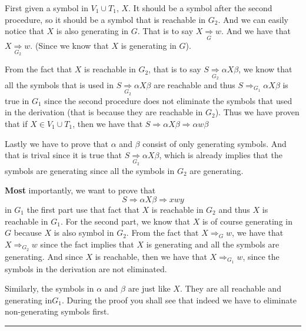 \documentclass[../main.tex]{subfiles}
\begin{document}
\begin{itemize}
First given a symbol in \(V _{1} \cup T _{1}\), \(X\). It 
should be a symbol after the second procedure, so it should 
be a symbol that is reachable in \(G _{2}\). And we can 
easily notice that \(X\) is also generating in \(G\). 
		That is to say \(X \mathop{\Rightarrow}\limits_{G} w\). And we have that \(X \mathop{\Rightarrow} \limits_{G_{2}} w\). (Since we know that \(X\) is generating in \(G\)).

		From the fact that \(X\) is reachable in \(G_{2}\), that is to say \(S \mathop{\Rightarrow} \limits_{G_{2}}\alpha X\beta \), we know that all the symbols that is used in 
		\(S \mathop{\Rightarrow}\limits _{G_{2}}\alpha X\beta\) are reachable and thus \(S \Rightarrow _{G_{1}}\alpha X\beta  \) is true in \(G _{1}\)  since the second procedure 
		does not eliminate the symbols that used in the 
		derivation (that is because they are reachable in \(G_{2}\)). Thus we have proven that if \(X \in V_{1} \cup T_{1}\), then we have that \(S \Rightarrow\alpha X\beta \Rightarrow\alpha w\beta\)

		Lastly we have to prove that \(\alpha\) and \(\beta\) consist of only generating symbols. And that is trival since it is true that \(S \mathop{\Rightarrow} \limits_{G_{2}} \alpha X\beta\), which is already implies that the symbols are 
		generating since all the symbols in \(G_{2}\) are 
		generating. 

		\textbf{Most} importantly, 
		we want to prove that 
		\[
		S \Rightarrow\alpha X\beta \Rightarrow xwy
		\]
		in \(G_{1}\) the first part use that fact that 
		\(X\) is reachable in \(G_2\) and thus \(X\) is reachable in \(G_{1}\). 
		For the second part, we know that \(X\) is of course generating in \(G\) because \(X\) is also symbol in \(G_{2}\). From the fact that \(X \Rightarrow _{G} w\), we have that 
		\(X \Rightarrow _{G _{2}} w\) since the fact implies that \(X \) is generating and all the symbols are generating. 
		And since \(X\) is reachable, then we have that 
		\(X \Rightarrow _{G_{1}} w\), since the symbols in the derivation are not eliminated.

		Similarly, the symbols in \(\alpha\) and \(\beta\) are just like \(X\). They are all reachable and generating in\(G_{1}\). 
		During the proof you shall see that indeed we have to eliminate non-generating symbols first. 
\end{itemize}
\hrule
\end{document}
